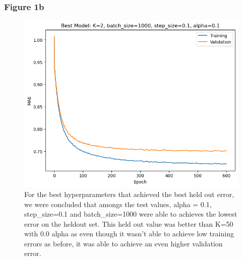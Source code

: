 \documentclass[a4paper]{article}
\begin{document}
\subsubsection{Figure 1b}
\begin{figure}[ht]
	\includegraphics[width=\textwidth]{../images/Figure1b.png}
	\caption{For the best hyperparameters that achieved the best held out error,
  we were concluded that amongs the test values, alpha = 0.1, step\_size=0.1 and
batch\_size=1000 were able to achieves the lowest error on the heldout set. This
held out value was better than K=50 with 0.0 alpha as even though it wasn't able
to achieve low training errors as before, it was able to achieve an even higher
validation error.}
\end{figure}


\pagebreak
\end{document}
